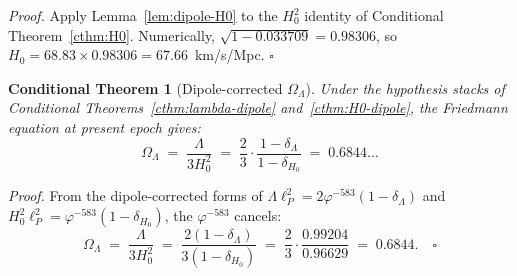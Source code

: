 \documentclass[11pt]{article}
\theoremstyle{plain}
\newtheorem{conditional}[theorem]{Conditional Theorem}
\theoremstyle{definition}
\theoremstyle{remark}
\begin{document}
\noindent\emph{Proof.} Apply Lemma~\ref{lem:dipole-H0} to the $H_0^2$ identity of Conditional Theorem~\ref{cthm:H0}. Numerically, $\sqrt{1 - 0.033709} = 0.98306$, so $H_0 = 68.83 \times 0.98306 = 67.66$~km/s/Mpc. \hfill$\square$

\begin{conditional}[Dipole-corrected $\Omega_\Lambda$]\label{cthm:omega-dipole}
Under the hypothesis stacks of Conditional Theorems~\ref{cthm:lambda-dipole} and~\ref{cthm:H0-dipole}, the Friedmann equation at present epoch gives:
\[
  \boxed{\;\Omega_\Lambda \;=\; \frac{\Lambda}{3 H_0^2} \;=\; \frac{2}{3} \cdot \frac{1 - \delta_\Lambda}{1 - \delta_{H_0}} \;=\; 0.6844\ldots\;}
\]
\end{conditional}

\noindent\emph{Proof.} From the dipole-corrected forms of $\Lambda \ell_P^2 = 2 \varphi^{-583}(1 - \delta_\Lambda)$ and $H_0^2 \ell_P^2 = \varphi^{-583}(1 - \delta_{H_0})$, the $\varphi^{-583}$ cancels:
\[
  \Omega_\Lambda \;=\; \frac{\Lambda}{3 H_0^2} \;=\; \frac{2(1 - \delta_\Lambda)}{3(1 - \delta_{H_0})} \;=\; \frac{2}{3} \cdot \frac{0.99204}{0.96629} \;=\; 0.6844. \quad\square
\]
\end{document}
